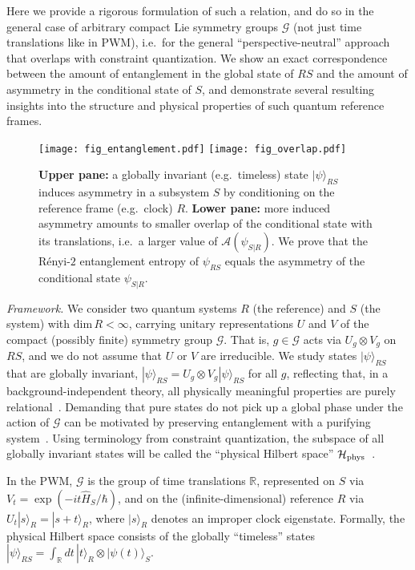 \documentclass[aps,10pt,twocolumn,showpacs,pra,citeautoscript,amsmath,amssymb,floatfix,superscriptaddress]{revtex4-1}
\def\dim{{\mathrm{dim}}}
\newcommand{\ch}{\mathcal H}
\newcommand{\cg}{\mathcal G}
\begin{document}
Here we provide a rigorous formulation of such a relation, and do so in the general case of arbitrary compact Lie symmetry groups $\mathcal{G}$ (not just time translations like in PWM), i.e.\ for the general ``perspective-neutral'' approach that overlaps with constraint quantization. We show an exact correspondence between the amount of entanglement in the global state of $RS$ and the amount of asymmetry in the conditional state of $S$, and demonstrate several resulting insights into the structure and physical properties of such quantum reference frames.

\begin{figure}[H]
\centering \texttt{[image: fig\_entanglement.pdf]}
\texttt{[image: fig\_overlap.pdf]}
\caption{\textbf{Upper pane:} a globally invariant (e.g.\ timeless) state $|\psi\rangle_{RS}$ induces asymmetry in a subsystem $S$ by conditioning on the reference frame (e.g.\ clock) $R$. \textbf{Lower pane:} more induced asymmetry amounts to smaller overlap of the conditional state with its translations, i.e.\ a larger value of $\mathcal{A}(\psi_{S|R})$. We prove that the R\'enyi-$2$ entanglement entropy of $\psi_{RS}$ equals the asymmetry of the conditional state $\psi_{S|R}$.}
\label{fig_overlap}
\end{figure}

\emph{Framework.} We consider two quantum systems $R$ (the reference) and $S$ (the system) with $\dim\,R<\infty$, carrying unitary representations $U$ and $V$ of the compact (possibly finite) symmetry group $\mathcal{G}$. That is, $g\in\mathcal{G}$ acts via $U_g\otimes V_g$ on $RS$, and we do not assume that $U$ or $V$ are irreducible. We study states $|\psi\rangle_{RS}$ that are globally invariant, $|\psi\rangle_{RS}=U_g\otimes V_g|\psi\rangle_{RS}$ for all $g$, reflecting that, in a background-independent theory, all physically meaningful properties are purely relational~\cite{Vanrietvelde,Vanrietvelde2,HoehnUniverse,Vanrietvelde3,Trinity,HSLRel,DGHLM21}. Demanding that pure states do not pick up a global phase under the action of $\cg$ can be motivated by preserving entanglement with a purifying system~\cite{HoehnKrummMueller}. Using terminology from constraint quantization, the subspace of all globally invariant states will be called the ``physical Hilbert space'' $\ch_{\rm phys}$~\cite{HenneauxTeitelboim,Vanrietvelde}.

In the PWM, $\mathcal{G}$ is the group of time translations $\mathbb{R}$, represented on $S$ via $V_t=\exp(-it\hat H_S/\hbar)$, and on the (infinite-dimensional) reference $R$ via $U_t |s\rangle_R=|s+t\rangle_R$, where $|s\rangle_R$ denotes an improper clock eigenstate. Formally, the physical Hilbert space consists of the globally ``timeless'' states $|\psi\rangle_{RS}=\int_{\mathbb{R}}dt\,|t\rangle_R\otimes|\psi(t)\rangle_S$.
\end{document}
